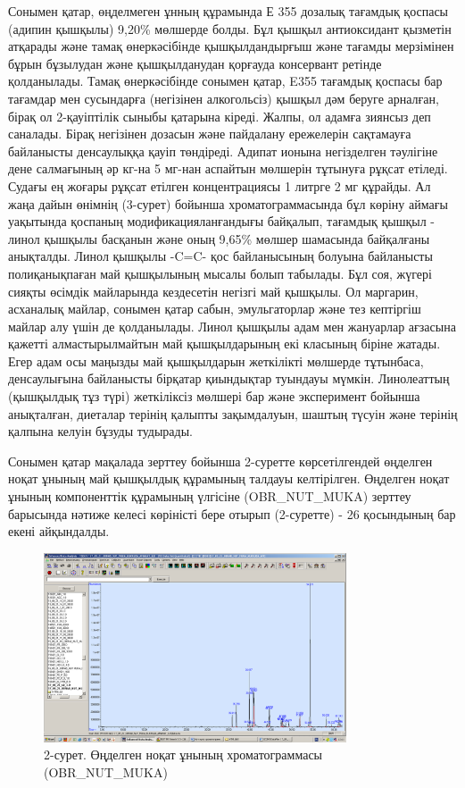 Сонымен қатар, өңделмеген ұнның құрамында Е 355 дозалық тағамдық қоспасы
(адипин қышқылы) 9,20\% мөлшерде болды. Бұл қышқыл антиоксидант қызметін
атқарады және тамақ өнеркәсібінде қышқылдандырғыш және тағамды
мерзімінен бұрын бұзылудан және қышқылданудан қорғауда консервант
ретінде қолданылады. Тамақ өнеркәсібінде сонымен қатар, E355 тағамдық
қоспасы бар тағамдар мен сусындарға (негізінен алкогольсіз) қышқыл дәм
беруге арналған, бірақ ол 2-қауіптілік сыныбы қатарына кіреді. Жалпы, ол
адамға зиянсыз деп саналады. Бірақ негізінен дозасын және пайдалану
ережелерін сақтамауға байланысты денсаулыққа қауіп төндіреді. Адипат
ионына негізделген тәулігіне дене салмағының әр кг-на 5 мг-нан аспайтын
мөлшерін тұтынуға рұқсат етіледі. Судағы ең жоғары рұқсат етілген
концентрациясы 1 литрге 2 мг құрайды. Ал жаңа дайын өнімнің (3-сурет)
бойынша хроматограммасында бұл көріну аймағы уақытында қоспаның
модификацияланғандығы байқалып, тағамдық қышқыл - линол қышқылы басқанын
және оның 9,65\% мөлшер шамасында байқалғаны анықталды. Линол қышқылы
-C=C- қос байланысының болуына байланысты полиқанықпаған май қышқылының
мысалы болып табылады. Бұл соя, жүгері сияқты өсімдік майларында
кездесетін негізгі май қышқылы. Ол маргарин, асханалық майлар, сонымен
қатар сабын, эмульгаторлар және тез кептіргіш майлар алу үшін де
қолданылады. Линол қышқылы адам мен жануарлар ағзасына қажетті
алмастырылмайтын май қышқылдарының екі класының біріне жатады. Егер адам
осы маңызды май қышқылдарын жеткілікті мөлшерде тұтынбаса, денсаулығына
байланысты бірқатар қиындықтар туындауы мүмкін. Линолеаттың (қышқылдық
тұз түрі) жеткіліксіз мөлшері бар және эксперимент бойынша анықталған,
диеталар терінің қалыпты зақымдалуын, шаштың түсуін және терінің қалпына
келуін бұзуды тудырады.

Сонымен қатар мақалада зерттеу бойынша 2-суретте көрсетілгендей өңделген
ноқат ұнының май қышқылдық құрамының талдауы келтірілген. Өңделген ноқат
ұнының компоненттік құрамының үлгісіне (OBR\_NUT\_MUKA) зерттеу
барысында нәтиже келесі көріністі бере отырып (2-суретте) - 26
қосындының бар екені айқындалды.

\begin{figure}[H]
	\centering
	\includegraphics[width=0.8\textwidth]{media/pish/image14}
	\caption*{2-сурет. Өңделген ноқат ұнының хроматограммасы (OBR\_NUT\_MUKA)}
\end{figure}



